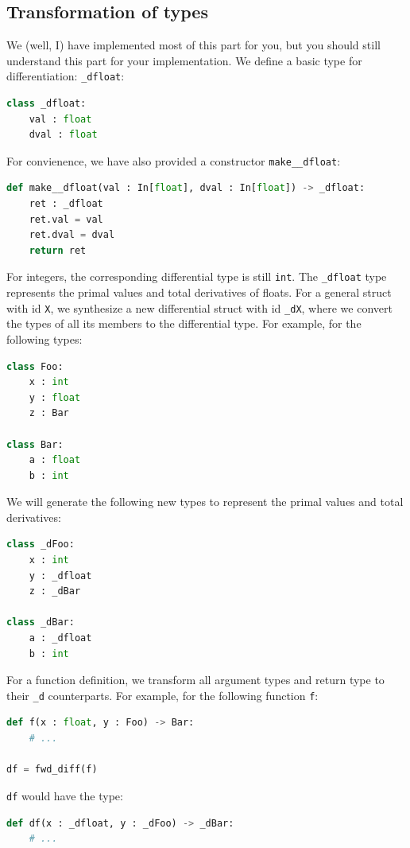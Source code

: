 \subsection{Transformation of types}
We (well, I) have implemented most of this part for you, but you should still understand this part for your implementation. We define a basic type for differentiation: \lstinline{_dfloat}:
\begin{lstlisting}[language=Python]
class _dfloat:
    val : float
    dval : float
\end{lstlisting}
For convienence, we have also provided a constructor \lstinline{make__dfloat}:
\begin{lstlisting}[language=Python]
def make__dfloat(val : In[float], dval : In[float]) -> _dfloat:
    ret : _dfloat
    ret.val = val
    ret.dval = dval
    return ret
\end{lstlisting}

For integers, the corresponding differential type is still \lstinline{int}.
The \lstinline{_dfloat} type represents the primal values and total derivatives of floats. For a general struct with id \lstinline{X}, we synthesize a new differential struct with id \lstinline{_dX}, where we convert the types of all its members to the differential type. For example, for the following types:
\begin{lstlisting}[language=Python]
class Foo:
    x : int
    y : float
    z : Bar

class Bar:
    a : float
    b : int
\end{lstlisting}
We will generate the following new types to represent the primal values and total derivatives:
\begin{lstlisting}[language=Python]
class _dFoo:
    x : int
    y : _dfloat
    z : _dBar

class _dBar:
    a : _dfloat
    b : int
\end{lstlisting}

For a function definition, we transform all argument types and return type to their \lstinline{_d} counterparts. For example, for the following function \lstinline{f}:
\begin{lstlisting}[language=Python]
def f(x : float, y : Foo) -> Bar:
    # ...

df = fwd_diff(f)
\end{lstlisting}
\lstinline{df} would have the type:
\begin{lstlisting}[language=Python]
def df(x : _dfloat, y : _dFoo) -> _dBar:
    # ...
\end{lstlisting}

